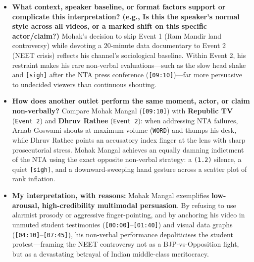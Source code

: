\documentclass[10pt,a4paper]{article}
\begin{document}
\begin{itemize}
His non-verbal cues \textbf{reinforce and visualise} complex statistical arguments (hand trajectories matching rank-inflation curves), \textbf{soften and humanise} policy analysis through quiet vocal drops \texttt{$^\circ$...$^\circ$}, and \textbf{gently invert bureaucratic jargon} via a weary \texttt{[sigh]} and dry \texttt{[chuckle]} when the NTA claims "complete transparency" (\texttt{[09:10]}).\par\smallskip
  \item \textbf{What context, speaker baseline, or format factors support or complicate this interpretation? (e.g., Is this the speaker's normal style across all videos, or a marked shift on this specific actor/claim?)}
Mohak's decision to skip Event 1 (Ram Mandir land controversy) while devoting a 20-minute data documentary to Event 2 (NEET crisis) reflects his channel's sociological baseline. Within Event 2, his restraint makes his rare non-verbal evaluations---such as the slow head shake and \texttt{[sigh]} after the NTA press conference (\texttt{[09:10]})---far more persuasive to undecided viewers than continuous shouting.\par\smallskip
  \item \textbf{How does another outlet perform the same moment, actor, or claim non-verbally?}
Compare Mohak Mangal (\texttt{[09:10]}) with \textbf{Republic TV} (\texttt{Event 2}) and \textbf{Dhruv Rathee} (\texttt{Event 2}): when addressing NTA failures, Arnab Goswami shouts at maximum volume (\texttt{WORD}) and thumps his desk, while Dhruv Rathee points an accusatory index finger at the lens with sharp prosecutorial stress. Mohak Mangal achieves an equally damning indictment of the NTA using the exact opposite non-verbal strategy: a \texttt{(1.2)} silence, a quiet \texttt{[sigh]}, and a downward-sweeping hand gesture across a scatter plot of rank inflation.\par\smallskip
  \item \textbf{My interpretation, with reasons:}
Mohak Mangal exemplifies \textbf{low-arousal, high-credibility multimodal persuasion}. By refusing to use alarmist prosody or aggressive finger-pointing, and by anchoring his video in unmuted student testimonies (\texttt{[00:00]}--\texttt{[01:40]}) and visual data graphs (\texttt{[04:10]}--\texttt{[07:45]}), his non-verbal performance depoliticises the student protest---framing the NEET controversy not as a BJP-vs-Opposition fight, but as a devastating betrayal of Indian middle-class meritocracy.\par\smallskip
\end{itemize}
\newpage
\end{document}
